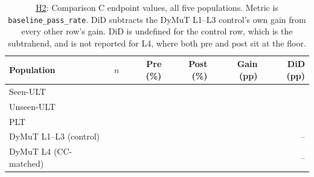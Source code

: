 \begin{table}[b]
\caption{\hyperref[sec:results-h2]{H2}: Comparison C endpoint values, all five populations. Metric is \texttt{baseline\_pass\_rate}. DiD subtracts the DyMuT L1--L3 control's own gain from every other row's gain. DiD is undefined for the control row, which is the subtrahend, and is not reported for L4, where both pre and post sit at the floor.}
\label{tab:h2endpoint}
\centering
\footnotesize
\setlength{\tabcolsep}{3.5pt}
\renewcommand{\arraystretch}{0.88}
\begin{tabular}{@{}lrrrrr@{}}
\toprule
Population & $n$ & Pre (\%) & Post (\%) & Gain (pp) & DiD (pp) \\
\midrule
Seen-ULT & \HTwoEndpointSeenN{} & \HTwoEndpointSeenPre{} & \HTwoEndpointSeenPost{} & \HTwoSeenGain{} & \HTwoSeenDid{} \\
Unseen-ULT & \HTwoEndpointUnseenN{} & \HTwoEndpointUnseenPre{} & \HTwoEndpointUnseenPost{} & \HTwoUnseenGain{} & \HTwoUnseenNetOfControl{} \\
PLT & \HTwoEndpointPltN{} & \HTwoEndpointPltPre{} & \HTwoEndpointPltPost{} & \HTwoPltGain{} & \HTwoPltDid{} \\
DyMuT L1--L3 (control) & \HTwoEndpointLOneLThreeN{} & \HTwoEndpointLOneLThreePre{} & \HTwoEndpointLOneLThreePost{} & \HTwoLOneLThreeGain{} & -- \\
DyMuT L4 (CC-matched) & \HTwoEndpointLFourN{} & \HTwoEndpointLFourPre{} & \HTwoEndpointLFourPost{} & \HTwoLFourGain{} & -- \\
\bottomrule
\end{tabular}
\end{table}

